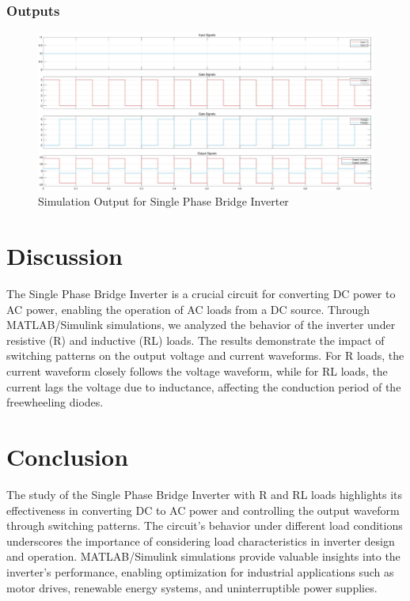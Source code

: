 \documentclass[12pt]{article}
\begin{document}
\subsubsection*{Outputs}
\begin{figure}[H]
    \centering
    \includegraphics[width=\textwidth]{output.jpeg}
    \caption{Simulation Output for Single Phase Bridge Inverter}
    \label{fig:rControlledNoDelay}
\end{figure}


\section*{Discussion}
The Single Phase Bridge Inverter is a crucial circuit for converting DC power to AC power, enabling the operation of AC loads from a DC source. Through MATLAB/Simulink simulations, we analyzed the behavior of the inverter under resistive (R) and inductive (RL) loads. The results demonstrate the impact of switching patterns on the output voltage and current waveforms. For R loads, the current waveform closely follows the voltage waveform, while for RL loads, the current lags the voltage due to inductance, affecting the conduction period of the freewheeling diodes.

\section*{Conclusion}
The study of the Single Phase Bridge Inverter with R and RL loads highlights its effectiveness in converting DC to AC power and controlling the output waveform through switching patterns. The circuit's behavior under different load conditions underscores the importance of considering load characteristics in inverter design and operation. MATLAB/Simulink simulations provide valuable insights into the inverter's performance, enabling optimization for industrial applications such as motor drives, renewable energy systems, and uninterruptible power supplies.


\renewcommand{\bibname}{References}

\end{document}
